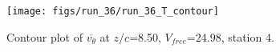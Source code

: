 \begin{figure}[H]
\centering
\texttt{[image: figs/run\_36/run\_36\_T\_contour]}
\caption{Contour plot of $\overline{v_{\theta}}$ at $z/c$=8.50, $V_{free}$=24.98, station 4.}
\label{fig:run_36_T_contour}
\end{figure}


